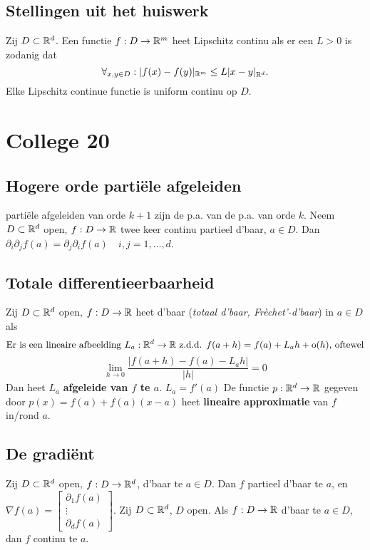 \documentclass{2wa40summary}
\begin{document}
	
	
	\subsection{Stellingen uit het huiswerk}
	\theorem Zij $D \subset \mathbb{R}^d$. Een functie $f:D \rightarrow \mathbb{R}^m$ heet Lipschitz continu als er een $L>0$ is zodanig dat
	\[\forall _{x,y \in D}: |f(x)-f(y)|_{\mathbb{R}^m} \leq L|x-y|_{\mathbb{R}^d}.\]
	Elke Lipschitz continue functie is uniform continu op $D$.
	\newpage
	\section{College 20}
	\subsection{Hogere orde parti\"ele afgeleiden}
	 parti\"ele afgeleiden van orde $k+1$ zijn de p.a. van de p.a. van orde $k$.
	 Neem $D \subset \mathbb{R}^d$ open, $f:D \rightarrow \mathbb{R}$ twee keer continu partieel d'baar, $a \in D$. Dan $\partial_i \partial_j f(a) = \partial_j \partial_i f(a) \quad i,j=1,\dots ,d$.
	\subsection{Totale differentieerbaarheid}
	 Zij $D \subset \mathbb{R}^d$ open, $f:D \rightarrow \mathbb{R}$ heet d'baar (\textit{totaal d'baar, Fr\`echet'-d'baar}) in $a \in D$ als
	\[\text{Er is een lineaire afbeelding } L_a:\mathbb{R}^d \rightarrow \mathbb{R} \text{ z.d.d. } f(a+h)=f(a)+L_a h +\mathrm{o}(h)\text{, oftewel}\]
	\[\lim_{h \rightarrow 0}\frac{|f(a+h)-f(a)-L_a h|}{|h|} = 0\]
	Dan heet $L_a$ \textbf{afgeleide van $f$ te $a$}.
	\nota $L_a = f'(a)$
	 De functie $ p: \mathbb{R}^d \rightarrow \mathbb{R} $ gegeven door $ p(x)=f(a)+f(a)(x-a) $ heet \textbf{lineaire approximatie} van $ f $ in/rond $ a $.
	\subsection{De gradi\"ent}
	 Zij $D \subset \mathbb{R}^d$ open, $f: D \rightarrow \mathbb{R}^d$, d'baar te $a \in D$. Dan $f$ partieel d'baar te $a$, en $\nabla f(a)= \begin{bmatrix}
	\partial_1 f(a) \\
	\vdots \\
	\partial_d f(a)
	\end{bmatrix}$.
	\theorem Zij $D \subset \mathbb{R}^d$, $D$ open. Als $f: D \rightarrow \mathbb{R}$ d'baar te $a \in D$, dan $f$ continu te $a$.
      		
\end{document}
